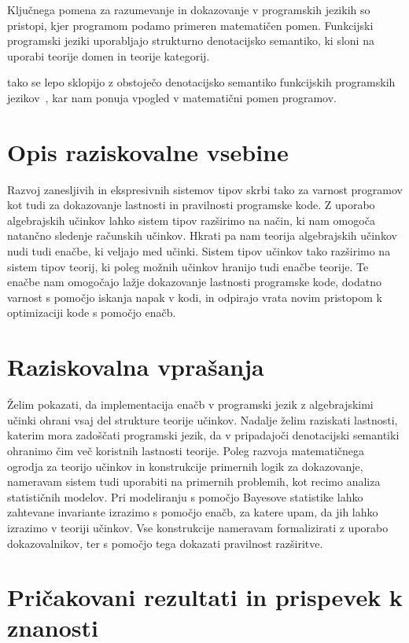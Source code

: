 \documentclass{article}
\begin{document}
Ključnega pomena za razumevanje in dokazovanje v programskih jezikih so pristopi, kjer programom podamo primeren matematičen pomen. Funkcijski programski jeziki uporabljajo strukturno denotacijsko semantiko, ki sloni na uporabi teorije domen in teorije kategorij.

tako se lepo sklopijo z obstoječo denotacijsko semantiko funkcijskih programskih jezikov~\cite{DBLP:journals/corr/BauerP13}, kar nam ponuja vpogled v matematični pomen programov. 

\section*{Opis raziskovalne vsebine}

Razvoj zanesljivih in ekspresivnih sistemov tipov skrbi tako za varnost programov kot tudi za dokazovanje lastnosti in pravilnosti programske kode. Z uporabo algebrajskih učinkov lahko sistem tipov razširimo na način, ki nam omogoča natančno sledenje računskih učinkov. Hkrati pa nam teorija algebrajskih učinkov nudi tudi enačbe, ki veljajo med učinki. Sistem tipov učinkov tako razširimo na sistem tipov teorij, ki poleg možnih učinkov hranijo tudi enačbe teorije. Te enačbe nam omogočajo lažje dokazovanje lastnosti programske kode, dodatno varnost s pomočjo iskanja napak v kodi, in odpirajo vrata novim pristopom k optimizaciji kode s pomočjo enačb.

\section*{Raziskovalna vprašanja}

Želim pokazati, da implementacija enačb v programski jezik z algebrajskimi učinki ohrani vsaj del strukture teorije učinkov. Nadalje želim raziskati lastnosti, katerim mora zadoščati programski jezik, da v pripadajoči denotacijski semantiki ohranimo čim več koristnih lastnosti teorije. Poleg razvoja matematičnega ogrodja za teorijo učinkov in konstrukcije primernih logik za dokazovanje, nameravam sistem tudi uporabiti na primernih problemih, kot recimo analiza statističnih modelov. Pri modeliranju s pomočjo Bayesove statistike lahko zahtevane invariante izrazimo s pomočjo enačb, za katere upam, da jih lahko izrazimo v teoriji učinkov. Vse konstrukcije nameravam formalizirati z uporabo dokazovalnikov, ter s pomočjo tega dokazati pravilnost razširitve. 

\section*{Pričakovani rezultati in prispevek k znanosti}
\end{document}
